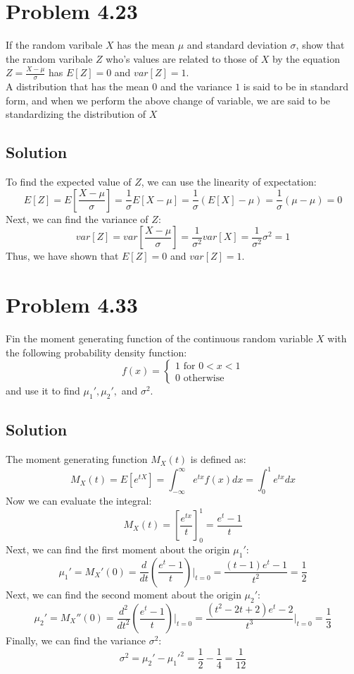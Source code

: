 \documentclass{article}
\begin{document}
\section*{Problem 4.23}
If the random varibale $X$ has the mean $\mu$ and standard deviation $\sigma$, show that the random varibale $Z$ who's values are related to those of $X$ by the equation $Z = \frac{X - \mu}{\sigma}$ has $E[Z] = 0 $ and $var[Z] = 1$.\\  
A distribution that has the mean $0$ and the variance $1$ is said to be in standard form, and when we perform the above change of variable, we are said to be standardizing the distribution of $X$
\subsection*{Solution}
To find the expected value of $Z$, we can use the linearity of expectation:
$$
E[Z] = E\left[\frac{X - \mu}{\sigma}\right] = \frac{1}{\sigma} E[X - \mu] = \frac{1}{\sigma} (E[X] - \mu) = \frac{1}{\sigma} (\mu - \mu) = 0
$$
Next, we can find the variance of $Z$:
$$
var[Z] = var\left[\frac{X - \mu}{\sigma}\right] = \frac{1}{\sigma^2} var[X] = \frac{1}{\sigma^2} \sigma^2 = 1
$$
Thus, we have shown that $E[Z] = 0$ and $var[Z] = 1$.
\section*{Problem 4.33}
Fin the moment generating function of the continuous random variable $X$ with the following probability density function:
$$ f(x) = \begin{cases}
    1 \text{ for } 0 < x < 1 \\
    0 \text{ otherwise}
\end{cases} $$
and use it to find $\mu_1', \mu_2',$ and $\sigma^2$.
\subsection*{Solution}
The moment generating function $M_X(t)$ is defined as:
$$
M_X(t) = E[e^{tX}] = \int_{-\infty}^{\infty} e^{tx} f(x) dx = \int_{0}^{1} e^{tx} dx
$$
Now we can evaluate the integral:
$$
M_X(t) = \left[ \frac{e^{tx}}{t} \right]_{0}^{1} = \frac{e^{t} - 1}{t}
$$
Next, we can find the first moment about the origin $\mu_1'$:
$$
\mu_1' = M_X'(0) = \frac{d}{dt} \left( \frac{e^{t} - 1}{t} \right) \bigg|_{t=0} = \frac{(t-1)e^t - 1}{t^2} = \frac{1}{2}
$$
Next, we can find the second moment about the origin $\mu_2'$:
$$
\mu_2' = M_X''(0) = \frac{d^2}{dt^2} \left( \frac{e^{t} - 1}{t} \right) \bigg|_{t=0} = \frac{(t^2-2t+2)e^t - 2}{t^3} \bigg|_{t=0} = \frac{1}{3}
$$
Finally, we can find the variance $\sigma^2$:
$$
\sigma^2 = \mu_2' - \mu_1'^2 = \frac{1}{2} - \frac{1}{4} = \frac{1}{12}
$$
\end{document}
